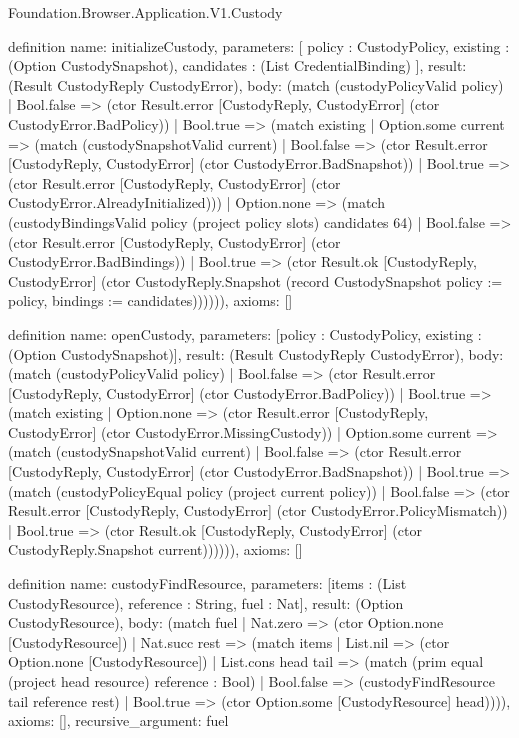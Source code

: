 \begin{lexlean}{Foundation.Browser.Application.V1.Custody}
\begin{semanticmodule}
definition{
  name: initializeCustody,
  parameters: [
    policy : CustodyPolicy,
    existing : (Option CustodySnapshot),
    candidates : (List CredentialBinding)
  ],
  result: (Result CustodyReply CustodyError),
  body: (match (custodyPolicyValid policy)
    | Bool.false => (ctor Result.error [CustodyReply, CustodyError] (ctor CustodyError.BadPolicy))
    | Bool.true => (match existing
      | Option.some current => (match (custodySnapshotValid current)
        | Bool.false => (ctor Result.error [CustodyReply, CustodyError] (ctor CustodyError.BadSnapshot))
        | Bool.true => (ctor Result.error [CustodyReply, CustodyError] (ctor CustodyError.AlreadyInitialized)))
      | Option.none => (match (custodyBindingsValid policy (project policy slots) candidates 64)
        | Bool.false => (ctor Result.error [CustodyReply, CustodyError] (ctor CustodyError.BadBindings))
        | Bool.true => (ctor Result.ok [CustodyReply, CustodyError] (ctor CustodyReply.Snapshot (record CustodySnapshot {policy := policy, bindings := candidates})))))),
  axioms: []
}

definition{
  name: openCustody,
  parameters: [policy : CustodyPolicy, existing : (Option CustodySnapshot)],
  result: (Result CustodyReply CustodyError),
  body: (match (custodyPolicyValid policy)
    | Bool.false => (ctor Result.error [CustodyReply, CustodyError] (ctor CustodyError.BadPolicy))
    | Bool.true => (match existing
      | Option.none => (ctor Result.error [CustodyReply, CustodyError] (ctor CustodyError.MissingCustody))
      | Option.some current => (match (custodySnapshotValid current)
        | Bool.false => (ctor Result.error [CustodyReply, CustodyError] (ctor CustodyError.BadSnapshot))
        | Bool.true => (match (custodyPolicyEqual policy (project current policy))
          | Bool.false => (ctor Result.error [CustodyReply, CustodyError] (ctor CustodyError.PolicyMismatch))
          | Bool.true => (ctor Result.ok [CustodyReply, CustodyError] (ctor CustodyReply.Snapshot current)))))),
  axioms: []
}

definition{
  name: custodyFindResource,
  parameters: [items : (List CustodyResource), reference : String, fuel : Nat],
  result: (Option CustodyResource),
  body: (match fuel
    | Nat.zero => (ctor Option.none [CustodyResource])
    | Nat.succ rest => (match items
      | List.nil => (ctor Option.none [CustodyResource])
      | List.cons head tail => (match (prim equal (project head resource) reference : Bool)
        | Bool.false => (custodyFindResource tail reference rest)
        | Bool.true => (ctor Option.some [CustodyResource] head)))),
  axioms: [],
  recursive_argument: fuel
}


\end{semanticmodule}
\end{lexlean}
